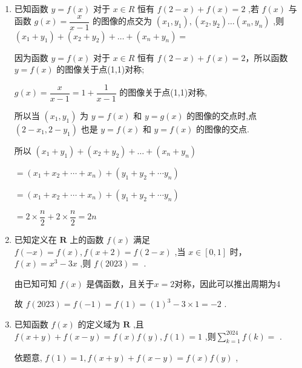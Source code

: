 \begin{enumerate}
\begin{jieda}
        $= {505} \times  0 + 1 + 0 - 1 = 0$ .
    \end{jieda}
    \item 已知函数 $y = f\left( x\right)$ 对于 $x \in  R$ 恒有 $f\left( {2 - x}\right)  + f\left( x\right)  = 2$ ,若 $f\left( x\right)$ 与函数 $g\left( x\right)  = \dfrac{x}{x - 1}$ 的图像的点交为 $\left( {{x}_{1},{y}_{1}}\right) ,\left( {{x}_{2},{y}_{2}}\right) \ldots \left( {{x}_{n},{y}_{n}}\right)$ ,则 $\left( {{x}_{1} + {y}_{1}}\right)  + \left( {{x}_{2} + {y}_{2}}\right)  + \ldots  + \left( {{x}_{n} + {y}_{n}}\right)  =$ 
    \begin{jieda}
        因为函数 $y = f\left( x\right)$ 对于 $x \in  R$ 恒有 $f\left( {2 - x}\right)  + f\left( x\right)  = 2$，所以函数 $y = f\left( x\right)$ 的图像关于点(1,1)对称;
        
        $g\left( x\right)  = \dfrac{x}{x - 1} = 1 + \dfrac{1}{x - 1}$ 的图像关于点(1,1)对称,
        
        所以当 $\left( {{x}_{1},{y}_{1}}\right)$ 为 $y = f\left( x\right)$ 和 $y = g\left( x\right)$ 的图像的交点时,点 $\left( {2 - {x}_{1},2 - {y}_{1}}\right)$ 也是 $y = f\left( x\right)$ 和 $y = f\left( x\right)$ 的图像的交点.
        
        所以 $\left( {{x}_{1} + {y}_{1}}\right)  + \left( {{x}_{2} + {y}_{2}}\right)  + \ldots  + \left( {{x}_{n} + {y}_{n}}\right)$
        
        $= \left( {{x}_{1} + {x}_{2} + \cdots  + {x}_{n}}\right)  + \left( {{y}_{1} + {y}_{2} + \cdots {y}_{n}}\right)$
        
        $= \left( {{x}_{1} + {x}_{2} + \cdots  + {x}_{n}}\right)  + \left( {{y}_{1} + {y}_{2} + \cdots {y}_{n}}\right)$
        
        $= 2 \times  \dfrac{n}{2} + 2 \times  \dfrac{n}{2} = {2n}$
    \end{jieda}
    \item 已知定义在 $\mathbf{R}$ 上的函数 $f\left( x\right)$ 满足 $f\left( {-x}\right)  = f\left( x\right) ,f\left( {x + 2}\right)  = f\left( {2 - x}\right)$ ,当 $x \in  \left\lbrack  {0,1}\right\rbrack$ 时，$f\left( x\right)  = {x}^{3} - {3x}$ ,则 $f\left( {2023}\right)  =$ .
    \begin{jieda}
        由已知可知 $f\left( x\right)$ 是偶函数，且关于$x = 2$对称，因此可以推出周期为4
        
        故 $f\left( {2023}\right)  = f\left( {-1}\right)  = f\left( 1\right)  = {\left( 1\right) }^{3} - 3 \times  1 =  - 2$ .
    \end{jieda}
    \item 已知函数 $f\left( x\right)$ 的定义域为 $\mathbf{R}$ ,且 $f\left( {x + y}\right)  + f\left( {x - y}\right)  = f\left( x\right) f\left( y\right) ,f\left( 1\right)  = 1$ ,则$\mathop{\sum }\limits_{{k = 1}}^{{2024}}f\left( k\right)  =$ .
    \begin{jieda}
        依题意, $f\left( 1\right)  = 1,f\left( {x + y}\right)  + f\left( {x - y}\right)  = f\left( x\right) f\left( y\right)$ ,
        

\end{jieda}
\end{enumerate}
